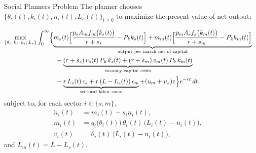 \documentclass[9pt,xcolor={svgnames}]{beamer}
\begin{document}
\begin{frame}{Social Planners Problem}\label{app:SPsetup}
The planner chooses $\{ \theta_i(t), k_i(t), n_i(t), L_s(t) \}_{t \ge 0}$ to maximize the present value of net output:
{\footnotesize
    \begin{align}
\max_{\{\theta_i,\,k_i,\,n_i,\,L_s\}}
&\int_{0}^{\infty}
\Bigl\{
\underbrace{%
m_s(t)\Bigl[\frac{p_sA_m f_m\bigl(k_s(t)\bigr)}{r+s_s} - P_k k_s(t) \Bigr]
+
m_m(t)\Bigl[\frac{p_mA_s f_s\bigl(k_m(t)\bigr)}{r+s_m} - P_k k_m(t) \Bigr]}_{%
\text{output per match net of capital}}
\nonumber\\
&\hspace{3em}
-\underbrace{%
(r+s_s)\,v_s(t)\,P_k\,k_s(t)
+
(r+s_m)\,v_m(t)\,P_k\,k_m(t)}_{%
\text{vacancy capital costs}}
\nonumber\\
&\hspace{3em}
-\underbrace{%
r\,L_s(t)\,\epsilon_s
+
r\,(L - L_s(t))\,\epsilon_m}_{%
\text{sectoral labor costs}}
+ (u_m+u_s)z\Bigr\}
e^{-rt}\,dt.
\label{eq:SPP_AS_two_sectors_objective_underbrace}
\end{align}
subject to, for each sector $i \in \{s,m\}$,
\begin{align}
    \dot{n}_i(t) & = m_i(t) - s_i n_i(t), \label{eq:ni_law_motion}\\
    m_i(t) & = q_i\bigl(\theta_i(t)\bigr)\,\theta_i(t)\,\bigl(L_i(t) - n_i(t)\bigr), \label{eq:mi_def}\\
    v_i(t) & = \theta_i(t)\,\bigl(L_i(t) - n_i(t)\bigr), \label{eq:vi_def}
\end{align}
and $L_m(t) = L - L_s(t)$.

\hyperlink{main:SPFOC}{}
}



\end{frame}
\end{document}

